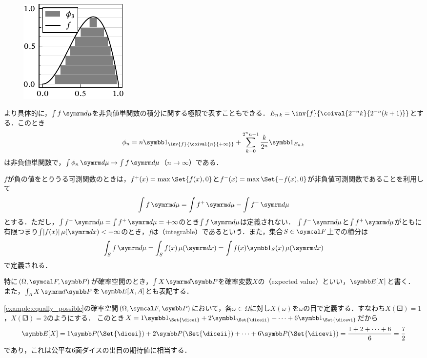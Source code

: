 \documentclass[../../main]{subfiles}
\begin{document}
\begin{figure}
  \includegraphics{figures/integration.pdf}
\end{figure}

より具体的に，\(\int f\measured{\mu}\)を非負値単関数の積分に関する極限で表すこともできる．\(\midx{E}{n}{k}=\inv{f}{\coival{2^{-n}k}{2^{-n}(k+1)}}\)とする．このとき
\[
  \phi_n = n\indicator_{\inv{f}{\coival{n}{+\infty}}}+\sum_{k=0}^{2^nn-1}\frac{k}{2^n}\indicator_{\midx{E}{n}{k}}
\]
は非負値単関数で，\(\int\phi_n\measured{\mu}\to\int f\measured{\mu}\)（\(n\to\infty\)）である．

\(f\)が負の値をとりうる可測関数のときは，\(f^{\mathord{+}}(x)=\max\Set{f(x),0}\)と\(f^{\mathord{-}}(x)=\max\Set{-f(x),0}\)が非負値可測関数であることを利用して
\[
  \int f\measured{\mu} = \int f^{\mathord{+}}\measured{\mu}-\int f^{\mathord{-}}\measured{\mu}
\]
とする．ただし，\(\int f^{\mathord{-}}\measured{\mu}=\int f^{\mathord{+}}\measured{\mu}=+\infty\)のとき\(\int f\measured{\mu}\)は定義されない．
\(\int f^{\mathord{-}}\measured{\mu}\)と\(\int f^{\mathord{+}}\measured{\mu}\)がともに有限\texttwoemdash つまり\(\int\abs{f(x)}\measured[x]{\mu}<+\infty\)\texttwoemdash のとき，\(f\)は（integrable）であるという．また，集合\(S\in\sigmaalg{F}\)上での積分は
\[
  \int_Sf\measured{\mu} = \int_Sf(x)\measured[x]{\mu}
  = \int f(x)\indicator_S(x)\measured[x]{\mu}
\]
で定義される．

特に\((\Omega,\sigmaalg{F},\prob)\)が確率空間のとき，\(\int X\measured{\prob}\)を確率変数\(X\)の（expected value）といい，\(\expval[X]\)と書く．
また，\(\int_AX\measured{\prob}\)を\(\expval[X,A]\)とも表記する．

\begin{example}
  \cref{example:equally_possible}の確率空間\((\Omega,\sigmaalg{F},\prob)\)において，各\(\omega\in\Omega\)に対し\(X(\omega)\)を\(\omega\)の目で定義する．すなわち\(X(\dicei)=1\)，\(X(\diceii)=2\)のようにする．
  このとき\(X=1\indicator_{\Set{\dicei}}+2\indicator_{\Set{\diceii}}+\dots+6\indicator_{\Set{\dicevi}}\)だから
  \[
    \expval[X] = 1\prob({\Set{\dicei}})+2\prob(\Set{\diceii})+\dots+6\prob({\Set{\dicevi}})
    = \frac{1+2+\dots+6}{6}
    = \frac{7}{2}
  \]
  であり，これは公平な6面ダイスの出目の期待値に相当する．
\end{example}
\end{document}

